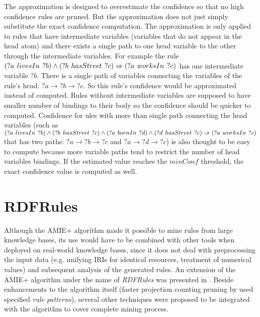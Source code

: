 The approximation is designed to overestimate the confidence so that no high confidence rules are pruned. But the approximation does not just simply substitute the exact confidence computation. The approximation is only applied to rules that have intermediate variables (variables that do not appear in the head atom) and there exists a single path to one head variable to the other through the intermediate variables. For example the rule $(?a\hspace{0.4em}livesIn\hspace{0.4em}?b) \land (?b\hspace{0.4em}hasStreet\hspace{0.4em}?c) \Rightarrow (?a\hspace{0.4em}worksIn\hspace{0.4em}?c)$ has one intermediate variable $?b$. There is a single path of variables connecting the variables of the rule's head: $?a \rightarrow ?b \rightarrow ?c$. So this rule's confidence would be approximated instead of computed. Rules without intermediate variables are supposed to have smaller number of bindings to their body so the confidence should be quicker to computed. Confidence for ules with more than single path connecting the head variables (such as $(?a\hspace{0.4em}livesIn\hspace{0.4em}?b) \land (?b\hspace{0.4em}hasStreet\hspace{0.4em}?c) \land (?a\hspace{0.4em}bornIn\hspace{0.4em}?d) \land (?d\hspace{0.4em}hasStreet\hspace{0.4em}?c)\Rightarrow (?a\hspace{0.4em}worksIn\hspace{0.4em}?c)$ that has two paths: $?a \rightarrow ?b \rightarrow ?c$ and $?a \rightarrow ?d \rightarrow ?c$) is also thought to be easy to compute because more variable paths tend to restrict the number of head variables bindings. If the estimated value reaches the $minConf$ threshold, the exact confidence value is computed as well.

\section{RDFRules}

Although the AMIE+ algorithm made it possible to mine rules from large knowledge bases, its use would have to be combined with other tools when deployed on real-world knowledge bases, since it does not deal with preprocessing the input data (e.g. unifying IRIs for identical resources, treatment of numerical values) and subsequent analysis of the generated rules. An extension of the AMIE+ algorithm under the name of \textit{RDFRules} was presented in \cite{Zeman2020}. Beside enhancements to the algorithm itself (faster projection counting pruning by used specified \textit{rule patterns}), several other techniques were proposed to be integrated with the algorithm to cover complete mining process.

